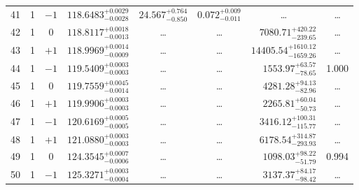 \begin{table*}[!]
\begin{tabular}{llcrrlrc}
41 & 1 & $-1$ & $    118.6483_{-      0.0028}^{+      0.0029}$ & $      24.567_{-       0.850}^{+       0.764}$ & $       0.072_{-       0.011}^{+       0.009}$ & \multicolumn{1}{c}{\dots} & \dots \\[1pt]
42 & 1 & 0 & $    118.8117_{-      0.0013}^{+      0.0018}$ & \multicolumn{1}{c}{\dots} & \multicolumn{1}{c}{\dots} & $     7080.71_{-      239.65}^{+      420.22}$ & \dots \\[1pt]
43 & 1 & $+1$ & $    118.9969_{-      0.0009}^{+      0.0014}$ & \multicolumn{1}{c}{\dots} & \multicolumn{1}{c}{\dots} & $    14405.54_{-     1659.26}^{+     1610.12}$ & \dots \\[1pt]
44 & 1 & $-1$ & $    119.5409_{-      0.0003}^{+      0.0003}$ & \multicolumn{1}{c}{\dots} & \multicolumn{1}{c}{\dots} & $     1553.97_{-       78.65}^{+       63.57}$ & 1.000\\[1pt]
45 & 1 & 0 & $    119.7559_{-      0.0014}^{+      0.0045}$ & \multicolumn{1}{c}{\dots} & \multicolumn{1}{c}{\dots} & $     4281.28_{-       82.96}^{+       94.13}$ & \dots \\[1pt]
46 & 1 & $+1$ & $    119.9906_{-      0.0003}^{+      0.0003}$ & \multicolumn{1}{c}{\dots} & \multicolumn{1}{c}{\dots} & $     2265.81_{-       50.73}^{+       60.04}$ & \dots\\[1pt]
47 & 1 & $-1$ & $    120.6169_{-      0.0005}^{+      0.0005}$ & \multicolumn{1}{c}{\dots} & \multicolumn{1}{c}{\dots} & $     3416.12_{-      115.77}^{+      100.31}$ & \dots \\[1pt]
48 & 1 & $+1$ & $    121.0880_{-      0.0003}^{+      0.0003}$ & \multicolumn{1}{c}{\dots} & \multicolumn{1}{c}{\dots} & $     6178.54_{-      293.93}^{+      314.87}$ & \dots \\[1pt]
49 & 1 & 0 & $    124.3545_{-      0.0006}^{+      0.0007}$ & \multicolumn{1}{c}{\dots} & \multicolumn{1}{c}{\dots} & $     1098.03_{-       51.79}^{+       98.22}$ & 0.994\\[1pt]

50 & 1 & $-1$ & $    125.3271_{-      0.0004}^{+      0.0003}$ & \multicolumn{1}{c}{\dots} & \multicolumn{1}{c}{\dots} & $     3137.37_{-       98.42}^{+       84.17}$ & \dots\\[1pt]

\hline
\end{tabular}
\end{table*}



